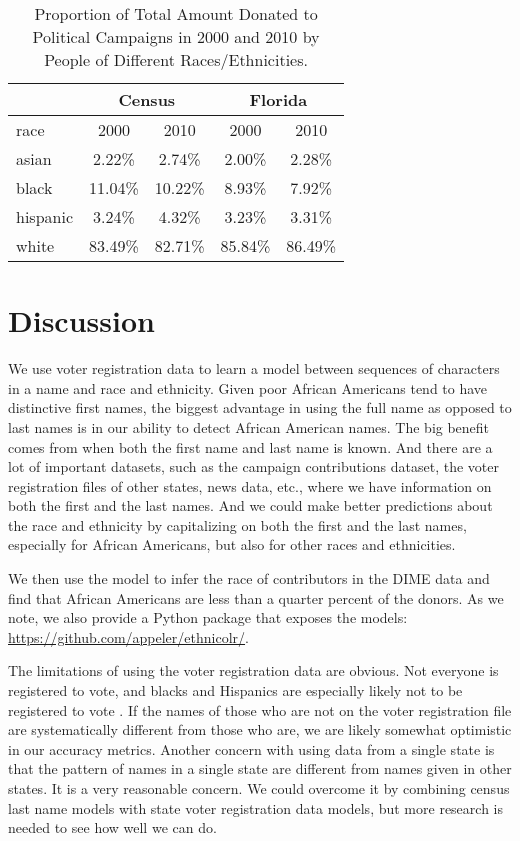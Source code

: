 \documentclass[12pt, letterpaper]{article}
\begin{document}
\begin{table}[h!]
\centering
\caption{Proportion of Total Amount Donated to Political Campaigns in 2000 and 2010 by People of Different Races/Ethnicities.}
\begin{tabular}{ l c c c c}
\hline
         & \multicolumn{2}{c}{Census} & \multicolumn{2}{c}{Florida}\\
\hline
race     &     2000     & 2010     &    2000    & 2010\\    
\hline
asian    &     2.22\%   & 2.74\%   &   2.00\%   & 2.28\%\\
black    &     11.04\%  & 10.22\%  &   8.93\%   & 7.92\%\\
hispanic &     3.24\%   & 4.32\%   &   3.23\%   & 3.31\%\\
white    &     83.49\%  & 82.71\%  &   85.84\%  & 86.49\%\\
\hline
\end{tabular}
\label{table:percentage_contrib_by_race}
\end{table}

\section*{Discussion}
We use voter registration data to learn a model between sequences of characters in a name and race and ethnicity. Given poor African Americans tend to have distinctive first names, the biggest advantage in using the full name as opposed to last names is in our ability to detect African American names. The big benefit comes from when both the first name and last name is known. And there are a lot of important datasets, such as the campaign contributions dataset, the voter registration files of other states, news data, etc., where we have information on both the first and the last names. And we could make better predictions about the race and ethnicity by capitalizing on both the first and the last names, especially for African Americans, but also for other races and ethnicities.

We then use the model to infer the race of contributors in the DIME data and find that African Americans are less than a quarter percent of the donors. As we note, we also provide a Python package that exposes the models: \url{https://github.com/appeler/ethnicolr/}.

The limitations of using the voter registration data are obvious. Not everyone is registered to vote, and blacks and Hispanics are especially likely not to be registered to vote \citep{ansolabehere2011gender}. If the names of those who are not on the voter registration file are systematically different from those who are, we are likely somewhat optimistic in our accuracy metrics. Another concern with using data from a single state is that the pattern of names in a single state are different from names given in other states. It is a very reasonable concern. We could overcome it by combining census last name models with state voter registration data models, but more research is needed to see how well we can do.
\end{document}
